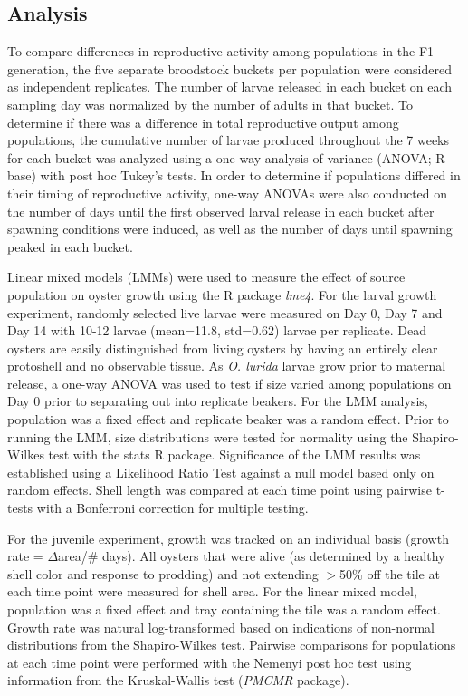 \documentclass[10pt,letterpaper]{article}
\begin{document}
\subsection*{Analysis}
To compare differences in reproductive activity among populations in the F1 generation, the five separate broodstock buckets per population were considered as independent replicates. The number of larvae released in each bucket on each sampling day was normalized by the number of adults in that bucket. To determine if there was a difference in total reproductive output among populations, the cumulative number of larvae produced throughout the 7 weeks for each bucket was analyzed using a one-way analysis of variance (ANOVA; R base) with post hoc Tukey's tests. In order to determine if populations differed in their timing of reproductive activity, one-way ANOVAs were also conducted on the number of days until the first observed larval release in each bucket after spawning conditions were induced, as well as the number of days until spawning peaked in each bucket.\par 
Linear mixed models (LMMs) were used to measure the effect of source population on oyster growth using the R package \textit{lme4}\cite{Bates2015-ky}. For the larval growth experiment, randomly selected live larvae were measured on Day 0, Day 7 and Day 14 with 10-12 larvae (mean=11.8, std=0.62) larvae per replicate. Dead oysters are easily distinguished from living oysters by having an entirely clear protoshell and no observable tissue. As \textit{O. lurida} larvae grow prior to maternal release, a one-way ANOVA was used to test if size varied among populations on Day 0 prior to separating out into replicate beakers. For the LMM analysis, population was a fixed effect and replicate beaker was a random effect. Prior to running the LMM, size distributions were tested for normality using the Shapiro-Wilkes test with the stats R package. Significance of the LMM results was established using a Likelihood Ratio Test against a null model based only on random effects. Shell length was compared at each time point using pairwise t-tests with a Bonferroni correction for multiple testing. \par 
For the juvenile experiment, growth was tracked on an individual basis (growth rate = $\Delta$area/\# days). All oysters that were alive (as determined by a healthy shell color and response to prodding) and not extending $>$50\% off the tile at each time point were measured for shell area. For the linear mixed model, population was a fixed effect and tray containing the tile was a random effect. Growth rate was natural log-transformed based on indications of non-normal distributions from the Shapiro-Wilkes test. Pairwise comparisons for populations at each time point were performed with the Nemenyi post hoc test using information from the Kruskal-Wallis test (\textit{PMCMR} package)\cite{Pohlert2014-lr}.
\end{document}

